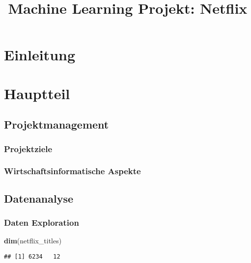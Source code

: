\documentclass[
]{article}
\title{Machine Learning Projekt: Netflix}
\author{}
\date{\vspace{-2.5em}}
\newenvironment{Shaded}{\begin{snugshade}}{\end{snugshade}}
\newcommand{\KeywordTok}[1]{\textcolor[rgb]{0.13,0.29,0.53}{\textbf{#1}}}
\newcommand{\NormalTok}[1]{#1}
\begin{document}
\maketitle

\hypertarget{einleitung}{%
\section{Einleitung}\label{einleitung}}

\hypertarget{hauptteil}{%
\section{Hauptteil}\label{hauptteil}}

\hypertarget{projektmanagement}{%
\subsection{Projektmanagement}\label{projektmanagement}}

\hypertarget{projektziele}{%
\subsubsection{Projektziele}\label{projektziele}}

\hypertarget{wirtschaftsinformatische-aspekte}{%
\subsubsection{Wirtschaftsinformatische
Aspekte}\label{wirtschaftsinformatische-aspekte}}

\hypertarget{datenanalyse}{%
\subsection{Datenanalyse}\label{datenanalyse}}

\hypertarget{daten-exploration}{%
\subsubsection{Daten Exploration}\label{daten-exploration}}

\begin{Shaded}
\begin{Highlighting}[]
\KeywordTok{dim}\NormalTok{(netflix_titles)}
\end{Highlighting}
\end{Shaded}

\begin{verbatim}
## [1] 6234   12
\end{verbatim}
\end{document}
